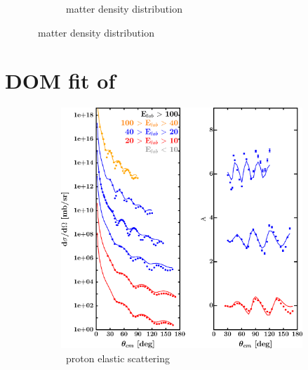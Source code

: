 \begin{figure}[hbtp]
\begin{subfigure}{0.70\textwidth}
        \caption{\snTwelve\ matter density distribution}
        \label{DOMFitData_sn112_matterDensity}
    \end{subfigure}
\end{figure}

\newpage
\section{DOM fit of \snFour}
\label{sn124DOMOutput}
\begin{figure}[hbtp]
    \captionsetup[subfigure]{labelformat=empty}
    \centering
    \begin{subfigure}[c]{0.39\textheight}
        \centering
        \includegraphics[width=\linewidth]{figures/sn124_protonElastic.png}
        \caption{\snFour\ proton elastic scattering}
        \label{DOMFitData_sn124_proton_elastic}
    \end{subfigure}\hspace{6pt}
    \begin{subfigure}[c]{0.39\textheight}
        \centering

\end{subfigure}
\end{figure}
